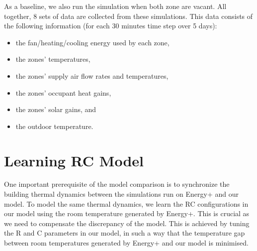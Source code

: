 As a baseline, we also run the simulation when both zone are vacant.
All together, 8 sets of data are collected from these simulations. This data consists of the following information (for each 30 minutes time step over 5 days):
\begin{itemize}
	\item the fan/heating/cooling energy used by each zone,
	\item the zones' temperatures,
	\item the zones' supply air flow rates and temperatures,
	\item the zones' occupant heat gains,
	\item the zones' solar gains, and
	\item the outdoor temperature.
\end{itemize}


\section{Learning RC Model}

One important prerequisite of the model comparison is to synchronize the building thermal dynamics between the simulations run on Energy+ and our model. To model the same thermal dynamics, we learn the RC configurations in our model using the room temperature generated by Energy+. This is crucial as we need to compensate the discrepancy of the model.
This is achieved by tuning the R and C parameters in our model, in such a way that the temperature gap between room temperatures generated by Energy+ and our model is minimised. 

